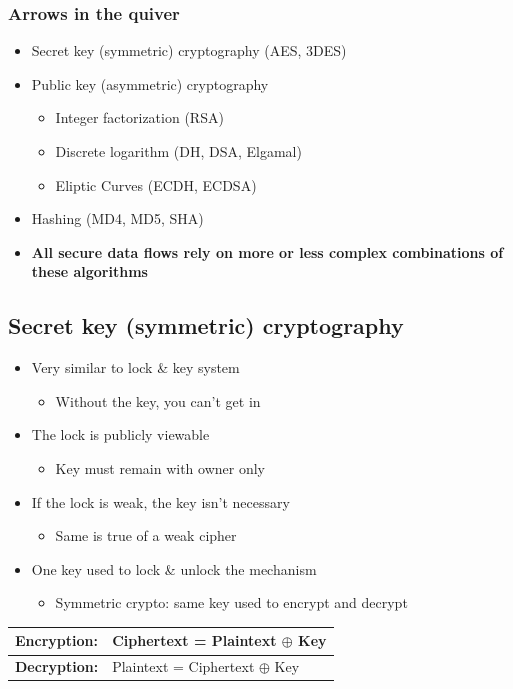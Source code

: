 \subsubsection{Arrows in the quiver}
\begin{itemize}
  \item Secret key (symmetric) cryptography (AES, 3DES)
  \item Public key (asymmetric) cryptography
  \begin{itemize}
    \item Integer factorization (RSA)
    \item Discrete logarithm (DH, DSA, Elgamal)
    \item Eliptic Curves (ECDH, ECDSA)
  \end{itemize}
  \item Hashing (MD4, MD5, SHA)
  \item \textbf{All secure data flows rely on more or less complex combinations of these algorithms}
\end{itemize}

\subsection{Secret key (symmetric) cryptography}

\begin{itemize}
  \item Very similar to lock \& key system
        \begin{itemize}
          \item Without the key, you can't get in
        \end{itemize}
  \item The lock is publicly viewable
        \begin{itemize}
          \item Key must remain with owner only
        \end{itemize}
  \item If the lock is weak, the key isn't necessary
        \begin{itemize}
          \item Same is true of a weak cipher
        \end{itemize}
  \item One key used to lock \& unlock the mechanism
        \begin{itemize}
          \item Symmetric crypto: same key used to encrypt and decrypt
        \end{itemize}
\end{itemize}
\begin{tabular}{|l|l|}
  \hline
  \textbf{Encryption:} & Ciphertext = Plaintext $\oplus$ Key \\
  \hline
  \textbf{Decryption:} & Plaintext = Ciphertext $\oplus$ Key \\
  \hline
\end{tabular}

